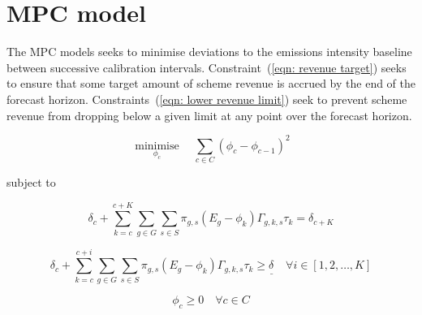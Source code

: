 \documentclass{article}
\newcommand{\sGenerators}{G}
\newcommand{\sScenarios}{S}
\newcommand{\sCalibrationIntervals}{C}
\newcommand{\iGenerator}{g}
\newcommand{\iYear}{y}
\newcommand{\iScenario}{s}
\newcommand{\iCalibrationInterval}{c}
\newcommand{\cSchemeRevenue}[1][\iYear]{\delta_{#1}}
\newcommand{\vBaseline}[1][\iCalibrationInterval]{\phi_{#1}}
\newcommand{\vPermitPrice}[1][\iCalibrationInterval]{\tau_{#1}}
\DeclareMathOperator*{\minimise}{minimise}
\begin{document}
\section{MPC model}
The MPC models seeks to minimise deviations to the emissions intensity baseline between successive calibration intervals. Constraint~(\ref{eqn: revenue target}) seeks to ensure that some target amount of scheme revenue is accrued by the end of the forecast horizon. Constraints~(\ref{eqn: lower revenue limit}) seek to prevent scheme revenue from dropping below a given limit at any point over the forecast horizon.

\begin{equation}
	\minimise\limits_{\vBaseline} \quad \sum\limits_{\iCalibrationInterval \in \sCalibrationIntervals} \left(\vBaseline[\iCalibrationInterval] - \vBaseline[\iCalibrationInterval-1]\right)^{2}
\end{equation}

subject to

\newcommand{\cScenarioProbibility}[1][\iGenerator,\iScenario]{\pi_{#1}}
\newcommand{\cCalibrationIntervalEmissions}[1][\iGenerator]{E_{#1}}
\newcommand{\cCalibrationIntervalEnergy}[1][\iGenerator,\iCalibrationInterval,\iScenario]{\Gamma_{#1}}
\newcommand{\SchemeRevenue}{R^{INT}}
\newcommand{\cSchemeRevenueLowerBound}{\underline{\cSchemeRevenue[]}}
\newcommand{\cSchemeRevenueUpperBound}{\overline{\cSchemeRevenue[]}}
\newcommand{\iCalibrationIntervalAlias}{k}
\newcommand{\cTotalCalibrationIntervals}{K}

\begin{equation}
	\cSchemeRevenue[\iCalibrationInterval] + \sum\limits_{\iCalibrationIntervalAlias=\iCalibrationInterval}^{\iCalibrationInterval + \cTotalCalibrationIntervals} \sum\limits_{\iGenerator \in \sGenerators} \sum\limits_{\iScenario \in \sScenarios} \cScenarioProbibility \left(\cCalibrationIntervalEmissions - \vBaseline[\iCalibrationIntervalAlias]\right) \cCalibrationIntervalEnergy[\iGenerator,\iCalibrationIntervalAlias,\iScenario] \vPermitPrice[\iCalibrationIntervalAlias] = \cSchemeRevenue[\iCalibrationInterval+\cTotalCalibrationIntervals]
	\label{eqn: revenue target}
\end{equation}

\begin{equation}
	\cSchemeRevenue[\iCalibrationInterval] + \sum\limits_{\iCalibrationIntervalAlias=\iCalibrationInterval}^{\iCalibrationInterval + i} \sum\limits_{\iGenerator \in \sGenerators} \sum\limits_{\iScenario \in \sScenarios} \cScenarioProbibility \left(\cCalibrationIntervalEmissions - \vBaseline[\iCalibrationIntervalAlias]\right) \cCalibrationIntervalEnergy[\iGenerator,\iCalibrationIntervalAlias,\iScenario] \vPermitPrice[\iCalibrationIntervalAlias] \geq \cSchemeRevenueLowerBound \quad \forall i \in \left[1, 2, \ldots, \cTotalCalibrationIntervals \right]
	\label{eqn: lower revenue limit}
\end{equation}

\begin{equation}
	\vBaseline \geq 0 \quad \forall \iCalibrationInterval \in \sCalibrationIntervals
\end{equation}
\end{document}
